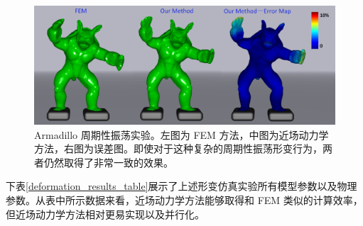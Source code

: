 \begin{figure}[!htb]
  \centering
  \captionsetup{justification=centering}
  \includegraphics[width=0.9\linewidth]{chap/image/demo_armadillo_vs_fem}

  \caption{\label{demo_armadillo_vs_fem}
           Armadillo 周期性振荡实验。左图为 FEM 方法，中图为近场动力学方法，右图为误差图。即使对于这种复杂的周期性振荡形变行为，两者仍然取得了非常一致的效果。
          }
\end{figure}

下表\ref{deformation_results_table}展示了上述形变仿真实验所有模型参数以及物理参数。从表中所示数据来看，近场动力学方法能够取得和 FEM 类似的计算效率，但近场动力学方法相对更易实现以及并行化。

